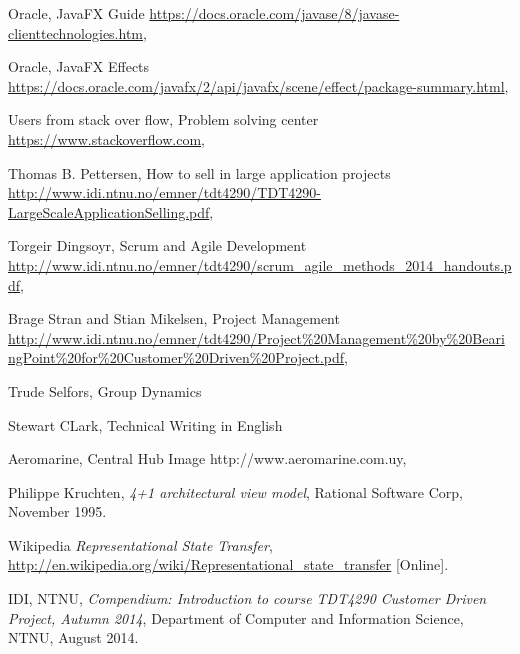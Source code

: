 \documentclass[../document]{subfiles}
\begin{document}
\begin{thebibliography}{1}
\label{Bibliography}


Oracle,
{JavaFX Guide}
\url{https://docs.oracle.com/javase/8/javase-clienttechnologies.htm},

Oracle,
{JavaFX Effects}
\url{https://docs.oracle.com/javafx/2/api/javafx/scene/effect/package-summary.html},

Users from stack over flow, 
{Problem solving center}
\url{https://www.stackoverflow.com},

Thomas B. Pettersen, 
{How to sell in large application projects}
\url{http://www.idi.ntnu.no/emner/tdt4290/TDT4290-LargeScaleApplicationSelling.pdf},

Torgeir Dingsoyr, 
{Scrum and Agile Development}
\url{http://www.idi.ntnu.no/emner/tdt4290/scrum_agile_methods_2014_handouts.pdf},

Brage Stran and Stian Mikelsen, 
{Project Management}
\url{http://www.idi.ntnu.no/emner/tdt4290/Project%20Management%20by%20BearingPoint%20for%20Customer%20Driven%20Project.pdf},

Trude Selfors, 
{Group Dynamics}

Stewart CLark, 
{Technical Writing in English}

Aeromarine,
{Central Hub Image}
http://www.aeromarine.com.uy,


 Philippe Kruchten, {\em 4+1 architectural view model}, Rational Software Corp, November 1995.

Wikipedia {\em Representational State Transfer}, \url{http://en.wikipedia.org/wiki/Representational_state_transfer} [Online].

 IDI, NTNU, {\em Compendium: Introduction to course TDT4290 Customer Driven Project, Autumn 2014}, Department of Computer and Information Science, NTNU,  August 2014.


\end{thebibliography}
\end{document}
